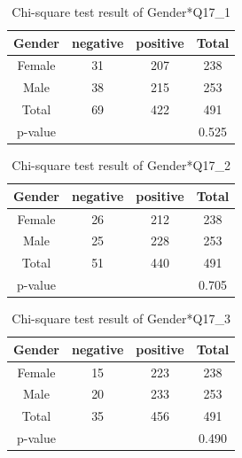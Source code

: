 \begin{table}[h]
  \caption{Chi-square test result of Gender*Q17\_1 }
  \label{table31a}
  \centering
\begin{tabular}{c|ccc}
\hline
Gender & negative & positive & Total \\
\hline
Female & 31                           & 207                          & 238                       \\
Male   & 38                           & 215                          & 253                       \\
Total  & 69                           & 422                          & 491                       \\
\hline
p-value      &        &      & 0.525   \\
\hline                   
\end{tabular}
\end{table}

\begin{table}[h]
  \vspace{-0.2cm}
  \caption{Chi-square test result of Gender*Q17\_2 }
  \label{table31b}
  \centering
\begin{tabular}{c|ccc}
\hline
Gender & negative & positive & Total \\
\hline
Female & 26                           & 212                          & 238                       \\
Male   & 25                          & 228                         & 253                       \\
Total  & 51                           & 440                          & 491                       \\
\hline
p-value      &        &      & 0.705   \\
\hline                   
\end{tabular}
\end{table}

\begin{table}[h]
  \vspace{-0.2cm}
  \caption{Chi-square test result of Gender*Q17\_3 }
  \label{table31c}
  \centering
\begin{tabular}{c|ccc}
\hline
Gender & negative & positive & Total \\
\hline
Female & 15                           & 223                          & 238                       \\
Male   & 20                          & 233                       & 253                       \\
Total  & 35                           & 456                          & 491                       \\
\hline
p-value     &        &      & 0.490   \\
\hline                   
\end{tabular}
\end{table}

